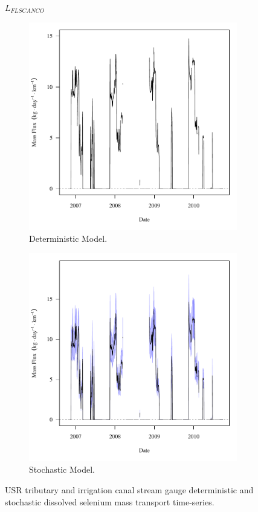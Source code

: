 \subfiguremid
\begin{landscape}
	\begin{figure}
		$ \displaystyle L_{FLSCANCO} $
		\begin{subfigure}{0.7\textwidth}
			\centering
			\includegraphics[width=\tableCustomSize]{"Figures/Results_USR/Deterministic/f FLS"}
			\caption{Deterministic Model.}
		\end{subfigure}%
		\begin{subfigure}{0.7\textwidth}
			\centering
			\includegraphics[width=\tableCustomSize]{"Figures/Results_USR/Stochastic/f FLS"}
			\caption{Stochastic Model.}
		\end{subfigure}
		\caption{USR tributary and irrigation canal stream gauge deterministic and stochastic dissolved selenium mass transport time-series.}
	\end{figure}
\end{landscape}
